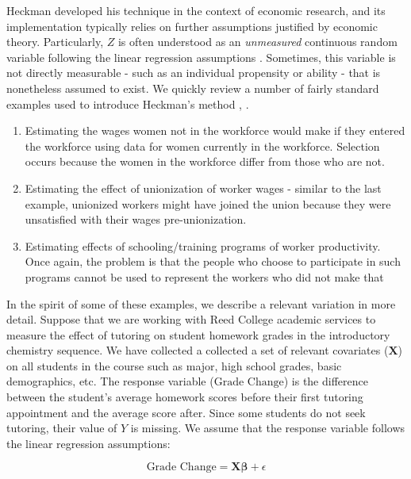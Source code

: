 \documentclass[12pt,twoside]{reedthesis}
\theoremstyle{definition}
\begin{document}
Heckman developed his technique in the context of economic research, and its implementation typically relies on further assumptions justified by economic theory. Particularly, $Z$ is often understood as an \emph{unmeasured} continuous random variable following the linear regression assumptions \citep{Winship_Mare_1992}. Sometimes,  this variable is not directly measurable - such as an individual propensity or ability - that is nonetheless assumed to exist. We quickly review a number of  fairly standard  examples used to introduce Heckman's method \citep{Heckman_1979}, \citep{Guo_2015}.

\begin{enumerate}
\item Estimating the wages women not in the workforce would make if they entered the workforce using data for women currently in the workforce. Selection occurs because the women in the workforce differ from those who are not.

\item Estimating the effect of unionization of worker wages - similar to the last example, unionized workers might have joined the union because they were unsatisfied with their wages pre-unionization.

\item Estimating effects of schooling/training programs of worker productivity. Once again, the problem is that the people who choose to participate in such programs cannot be used to represent the workers who did not make that 
\end{enumerate}

In the spirit of some of these examples, we describe a relevant variation in more detail. Suppose that we are working with Reed College academic services to measure the effect of tutoring on student homework grades in the introductory chemistry sequence. We have collected a collected a set of relevant covariates ($\mathbf{X}$) on all students in the course such as major, high school grades, basic demographics, etc. The response variable ($\text{Grade Change}$) is the difference between the student's average homework scores before their first tutoring appointment and the average score after. Since some students do not seek tutoring, their value of $Y$ is missing. We assume that the response variable follows the linear regression assumptions:

$$\text{Grade Change} =   \mathbf{X}\boldsymbol{\beta} + \epsilon$$
\end{document}
